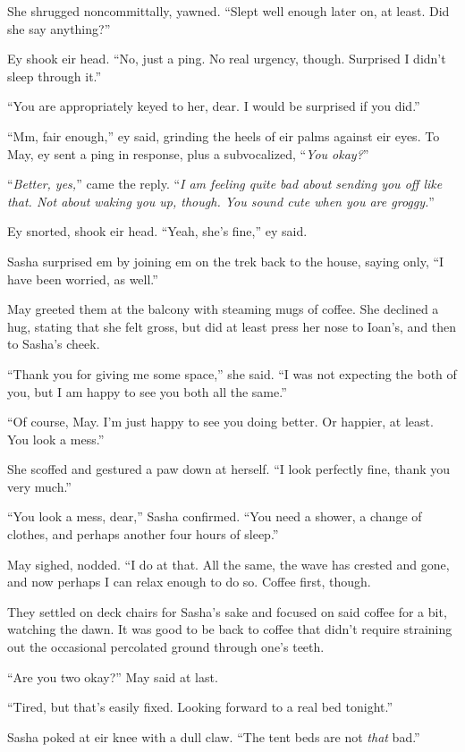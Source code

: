 She shrugged noncommittally, yawned. ``Slept well enough later on, at least. Did she say anything?''

Ey shook eir head. ``No, just a ping. No real urgency, though. Surprised I didn't sleep through it.''

``You are appropriately keyed to her, dear. I would be surprised if you did.''

``Mm, fair enough,'' ey said, grinding the heels of eir palms against eir eyes. To May, ey sent a ping in response, plus a subvocalized, ``\emph{You okay?}''

``\emph{Better, yes,}'' came the reply. ``\emph{I am feeling quite bad about sending you off like that. Not about waking you up, though. You sound cute when you are groggy.}''

Ey snorted, shook eir head. ``Yeah, she's fine,'' ey said.

Sasha surprised em by joining em on the trek back to the house, saying only, ``I have been worried, as well.''

May greeted them at the balcony with steaming mugs of coffee. She declined a hug, stating that she felt gross, but did at least press her nose to Ioan's, and then to Sasha's cheek.

``Thank you for giving me some space,'' she said. ``I was not expecting the both of you, but I am happy to see you both all the same.''

``Of course, May. I'm just happy to see you doing better. Or happier, at least. You look a mess.''

She scoffed and gestured a paw down at herself. ``I look perfectly fine, thank you very much.''

``You look a mess, dear,'' Sasha confirmed. ``You need a shower, a change of clothes, and perhaps another four hours of sleep.''

May sighed, nodded. ``I do at that. All the same, the wave has crested and gone, and now perhaps I can relax enough to do so. Coffee first, though.

They settled on deck chairs for Sasha's sake and focused on said coffee for a bit, watching the dawn. It was good to be back to coffee that didn't require straining out the occasional percolated ground through one's teeth.

``Are you two okay?'' May said at last.

``Tired, but that's easily fixed. Looking forward to a real bed tonight.''

Sasha poked at eir knee with a dull claw. ``The tent beds are not \emph{that} bad.''

